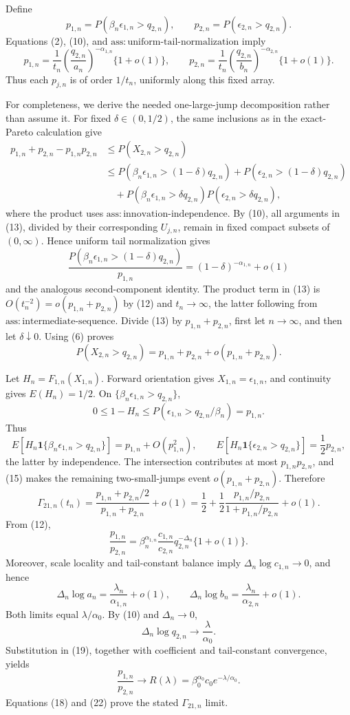 Define
\[
p_{1,n}=P(\beta_n\epsilon_{1,n}>q_{2,n}),
\qquad p_{2,n}=P(\epsilon_{2,n}>q_{2,n}).
\tag{11}
\]
Equations (2), (10), and \(\mathrm{ass{:}uniform\text{-}tail\text{-}normalization}\) imply
\[
p_{1,n}=\frac1{t_n}\left(\frac{q_{2,n}}{a_n}\right)^{-\alpha_{1,n}}\{1+o(1)\},
\qquad
p_{2,n}=\frac1{t_n}\left(\frac{q_{2,n}}{b_n}\right)^{-\alpha_{2,n}}\{1+o(1)\}.
\tag{12}
\]
Thus each \(p_{j,n}\) is of order \(1/t_n\), uniformly along this fixed array.

For completeness, we derive the needed one-large-jump decomposition rather than assume it. For fixed \(\delta\in(0,1/2)\), the same inclusions as in the exact-Pareto calculation give
\[
\begin{split}
p_{1,n}+p_{2,n}-p_{1,n}p_{2,n}
&\leq P(X_{2,n}>q_{2,n})\\
&\leq P(\beta_n\epsilon_{1,n}>(1-\delta)q_{2,n})
+P(\epsilon_{2,n}>(1-\delta)q_{2,n})\\
&\quad+P(\beta_n\epsilon_{1,n}>\delta q_{2,n})
P(\epsilon_{2,n}>\delta q_{2,n}),
\end{split}
\tag{13}
\]
where the product uses \(\mathrm{ass{:}innovation\text{-}independence}\). By (10), all arguments in (13), divided by their corresponding \(U_{j,n}\), remain in fixed compact subsets of \((0,\infty)\). Hence uniform tail normalization gives
\[
\frac{P(\beta_n\epsilon_{1,n}>(1-\delta)q_{2,n})}{p_{1,n}}
=(1-\delta)^{-\alpha_{1,n}}+o(1)
\tag{14}
\]
and the analogous second-component identity. The product term in (13) is \(O(t_n^{-2})=o(p_{1,n}+p_{2,n})\) by (12) and \(t_n\to\infty\), the latter following from \(\mathrm{ass{:}intermediate\text{-}sequence}\). Divide (13) by \(p_{1,n}+p_{2,n}\), first let \(n\to\infty\), and then let \(\delta\downarrow0\). Using (6) proves
\[
P(X_{2,n}>q_{2,n})=p_{1,n}+p_{2,n}+o(p_{1,n}+p_{2,n}).
\tag{15}
\]

Let \(H_n=F_{1,n}(X_{1,n})\). Forward orientation gives \(X_{1,n}=\epsilon_{1,n}\), and continuity gives \(E(H_n)=1/2\). On \(\{\beta_n\epsilon_{1,n}>q_{2,n}\}\),
\[
0\leq1-H_n\leq P(\epsilon_{1,n}>q_{2,n}/\beta_n)=p_{1,n}.
\tag{16}
\]
Thus
\[
E[H_n\mathbf1\{\beta_n\epsilon_{1,n}>q_{2,n}\}]
=p_{1,n}+O(p_{1,n}^2),
\qquad
E[H_n\mathbf1\{\epsilon_{2,n}>q_{2,n}\}]=\frac12p_{2,n},
\tag{17}
\]
the latter by independence. The intersection contributes at most \(p_{1,n}p_{2,n}\), and (15) makes the remaining two-small-jumps event \(o(p_{1,n}+p_{2,n})\). Therefore
\[
\Gamma_{21,n}(t_n)
=\frac{p_{1,n}+p_{2,n}/2}{p_{1,n}+p_{2,n}}+o(1)
=\frac12+\frac12\frac{p_{1,n}/p_{2,n}}{1+p_{1,n}/p_{2,n}}+o(1).
\tag{18}
\]
From (12),
\[
\frac{p_{1,n}}{p_{2,n}}
=\beta_n^{\alpha_{1,n}}\frac{c_{1,n}}{c_{2,n}}
q_{2,n}^{-\Delta_n}\{1+o(1)\}.
\tag{19}
\]
Moreover, scale locality and tail-constant balance imply \(\Delta_n\log c_{1,n}\to0\), and hence
\[
\Delta_n\log a_n=\frac{\lambda_n}{\alpha_{1,n}}+o(1),
\qquad
\Delta_n\log b_n=\frac{\lambda_n}{\alpha_{2,n}}+o(1).
\tag{20}
\]
Both limits equal \(\lambda/\alpha_0\). By (10) and \(\Delta_n\to0\),
\[
\Delta_n\log q_{2,n}\to\frac{\lambda}{\alpha_0}.
\tag{21}
\]
Substitution in (19), together with coefficient and tail-constant convergence, yields
\[
\frac{p_{1,n}}{p_{2,n}}\to
R(\lambda)=\beta_0^{\alpha_0}c_0e^{-\lambda/\alpha_0}.
\tag{22}
\]
Equations (18) and (22) prove the stated \(\Gamma_{21,n}\) limit.

